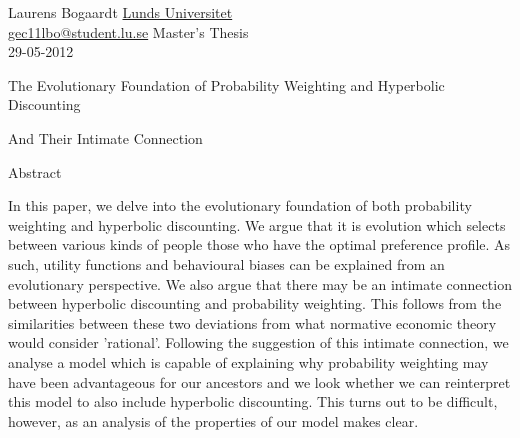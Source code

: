 \documentclass[a4paper,10pt]{article}
\numberwithin{equation}{section}
\begin{document}
\label{sec:Cover Page}

Laurens Bogaardt \hfill \href{http://www.lu.se}{Lunds Universitet}\\
\href{mailto:gec11lbo@student.lu.se}{gec11lbo@student.lu.se} \hfill Master's Thesis\\
 \hfill 29-05-2012\\

\vspace{3cm}

\begin{center}
\begin{LARGE}
\begin{bf}
The Evolutionary Foundation of Probability Weighting and Hyperbolic Discounting
\end{bf}
\end{LARGE}
\end{center}

\vspace{0cm}

\begin{center}
\begin{large}
\begin{bf}
And Their Intimate Connection
\end{bf}
\end{large}
\end{center}

\vfill

\begin{center}
\begin{minipage}[t]{0.7\textwidth}
\begin{bf}
Abstract
\end{bf}
\newline
\newline
In this paper, we delve into the evolutionary foundation of both probability weighting and hyperbolic discounting. We argue that it is evolution which selects between various kinds of people those who have the optimal preference profile. As such, utility functions and behavioural biases can be explained from an evolutionary perspective. We also argue that there may be an intimate connection between hyperbolic discounting and probability weighting. This follows from the similarities between these two deviations from what normative economic theory would consider 'rational'. Following the suggestion of this intimate connection, we analyse a model which is capable of explaining why probability weighting may have been advantageous for our ancestors and we look whether we can reinterpret this model to also include hyperbolic discounting. This turns out to be difficult, however, as an analysis of the properties of our model makes clear. 
\end{minipage}
\end{center}
\end{document}
